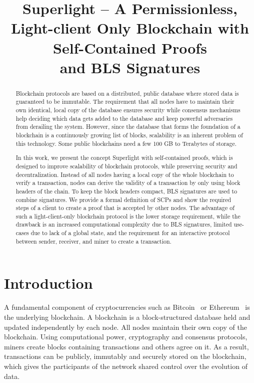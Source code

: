 \documentclass[conference]{IEEEtran}
\begin{document}
\title{Superlight -- A Permissionless, Light-client Only Blockchain with Self-Contained Proofs \\and BLS Signatures}

\author{
}

\maketitle
	
\begin{abstract}
Blockchain protocols are based on a distributed, public database where stored data is guaranteed to be immutable. The requirement that all nodes have to maintain their own identical, local copy of the database ensures security while consensus mechanisms help deciding which data gets added to the database and keep powerful adversaries from derailing the system. However, since the database that forms the foundation of a blockchain is a continuously growing list of blocks, scalability is an inherent problem of this technology. Some public blockchains need a few 100 GB to Terabytes of storage.

In this work, we present the concept Superlight with self-contained proofs, which is designed to improve scalability of blockchain protocols, while preserving security and decentralization. Instead of all nodes having a local copy of the whole blockchain to verify a transaction, nodes can derive the validity of a transaction by only using block headers of the chain. To keep the block headers compact, BLS signatures are used to combine signatures. We provide a formal definition of SCPs and show the required steps of a client to create a proof that is accepted by other nodes. The advantage of such a light-client-only blockchain protocol is the lower storage requirement, while the drawback is an increased computational complexity due to BLS signatures, limited use-cases due to lack of a global state, and the requirement for an interactive protocol between sender, receiver, and miner to create a transaction.
\end{abstract}

\section{Introduction}
A fundamental component of cryptocurrencies such as Bitcoin~\cite{Nakamoto08} or Ethereum~\cite{Wood14} is the underlying blockchain. A blockchain is a block-structured database held and updated independently by each node. All nodes maintain their own copy of the blockchain. Using computational power, cryptography and consensus protocols, miners create blocks containing transactions and others agree on it. As a result, transactions can be publicly, immutably and securely stored on the blockchain, which gives the participants of the network shared control over the evolution of data.
\end{document}

